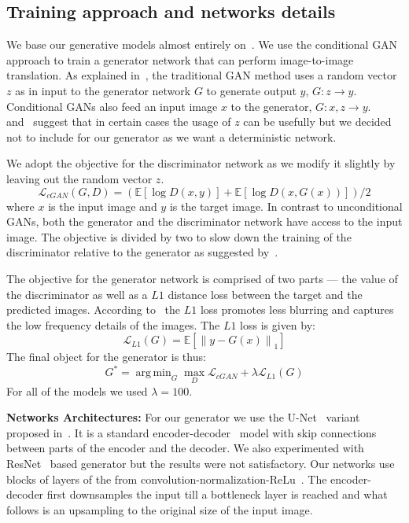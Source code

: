 \documentclass{llncs}
\DeclareMathOperator*{\argminA}{arg\,min}
\begin{document}
\subsection{Training approach and networks details}
We base our generative models almost entirely on~\cite{pix2pix}. We use the conditional GAN approach to train a generator network that can perform image-to-image translation. As explained in~\cite{pix2pix}, the traditional GAN method uses a random vector $z$ as in input to the generator network $G$ to generate output $y$, $G:z \rightarrow y$. Conditional GANs also feed an input image $x$ to the generator, $G: x,z \rightarrow y$.~\cite{pix2pix} and~\cite{wang2016} suggest that in certain cases the usage of $z$ can be usefully but we decided not to include for our generator as we want a deterministic network.

We adopt the objective for the discriminator network as we modify it slightly by leaving out the random vector $z$.
\begin{equation}
\mathcal{L}_{cGAN} (G, D) = (\mathbb{E}[\log D (x,y)] + \mathbb{E}[\log D (x, G(x))])/2
\end{equation}
where $x$ is the input image and $y$ is the target image. In contrast to unconditional GANs, both the generator and the discriminator network have access to the input image. The objective is divided by two to slow down the training of the discriminator relative to the generator as suggested by~\cite{pix2pix}.

The objective for the generator network is comprised of two parts --- the value of the discriminator as well as a $L1$ distance loss between the target and the predicted images. According to~\cite{pix2pix} the $L1$ loss promotes less blurring and captures the low frequency details of the images. The $L1$ loss is given by:
\begin{equation}
\mathcal{L}_{L1} (G) = \mathbb{E}[\left\lVert y - G(x)\right\rVert_1]
\end{equation}
The final object for the generator is thus:
\begin{equation}
G^* = \argminA_G \max_D \mathcal{L}_{cGAN}  + \lambda \mathcal{L}_{L1} (G)
\end{equation}
For all of the models we used $\lambda = 100$.

\noindent\textbf{Networks Architectures:} For our generator we use the U-Net~\cite{ronneberger2015} variant proposed in~\cite{pix2pix}. It is a standard encoder-decoder~\cite{hinton2006} model with skip connections between parts of the encoder and the decoder. We also experimented with ResNet~\cite{he2015} based generator but the results were not satisfactory. Our networks use blocks of layers of the from convolution-normalization-ReLu~\cite{batchnorm}. The encoder-decoder first downsamples the input till a bottleneck layer is reached and what follows is an upsampling to the original size of the input image.
\end{document}
